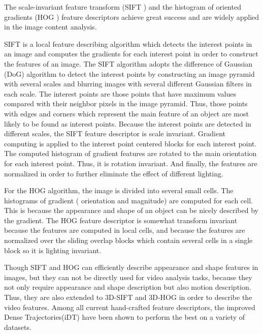 The scale-invariant feature transform (SIFT \cite{lowe1999} \cite{lowe2004})  and the histogram of oriented gradients (HOG \cite{hog}) feature descriptors achieve great success and are widely applied in the image content analysis. 
\par 
SIFT is a local feature describing algorithm which detects the interest points in an image and computes the gradients for each interest point in order to construct the features of an image. The SIFT algorithm adopts the difference of Gaussian (DoG) algorithm to detect the interest points by constructing an image pyramid with several scales and blurring images with several different Gaussian filters in each scale. The interest points are those points that have maximum values compared with their neighbor pixels in the image pyramid. Thus, those points with edges and corners which represent the main feature of an object are most likely to be found as interest points. Because the interest points are detected in different scales, the  SIFT feature descriptor is scale invariant. Gradient computing is applied to the interest point centered blocks for each interest point. The computed histogram of gradient features are rotated to the main orientation for each interest point. Thus, it is rotation invariant. And finally, the features are normalized in order to further eliminate the effect of different lighting.
\par 
For the HOG algorithm, the image is divided into several small cells. The histograms of gradient ( orientation and magnitude) are computed for each cell. This is because the appearance and shape of an object can be nicely described by the gradient. The HOG feature descriptor is somewhat transform invariant because the features are computed in local cells, and because the features are normalized over the sliding overlap blocks which contain several cells in a single block so it is lighting invariant.
\par
Though SIFT and HOG can efficiently describe appearance and shape features in images, but they can not be directly used for video analysis tasks, because they not only require appearance and shape description but also motion description. Thus, they are also extended to 3D-SIFT\cite{grepory2010} \cite{paul2007} and 3D-HOG\cite{alex2008} in order to describe the video features. Among all current hand-crafted feature descriptors, the improved Dense Trajectories(iDT)\cite{wang2012}\cite{wang2013} have been shown to perform the best on a variety of datasets. 

